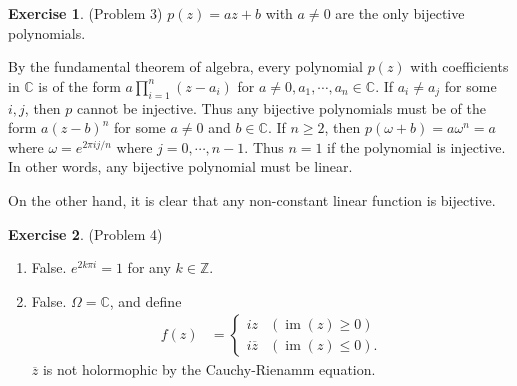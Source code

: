 \documentclass[12pt, psamsfonts]{amsart}
\theoremstyle{definition}
\newtheorem*{exer}{Exercise}
\theoremstyle{remark}
\DeclareMathOperator{\im}{im}
\numberwithin{equation}{section}
\begin{document}
\begin{exer}{(Problem 3)}
  $p(z) = az + b$ with $a \ne 0$ are the only bijective polynomials.

  By the fundamental theorem of algebra, every polynomial $p(z)$ with coefficients in $\mathbb{C}$ is of the form $a\prod_{i=1}^{n}(z - a_i)$ for $a \ne 0, a_1, \cdots, a_n \in \mathbb{C}$.
  If $a_i \ne a_j$ for some $i, j$, then $p$ cannot be injective.
  Thus any bijective polynomials must be of the form $a(z - b)^n$ for some $a \ne 0$ and $b \in \mathbb{C}$.
  If $n \geq 2$, then $p(\omega + b) = a\omega^n = a$ where $\omega = e^{2\pi i j / n}$ where $j = 0, \cdots, n - 1$.
  Thus $n = 1$ if the polynomial is injective.
  In other words, any bijective polynomial must be linear.

  On the other hand, it is clear that any non-constant linear function is bijective.
\end{exer}

\begin{exer}{(Problem 4)}
 $ $
  \begin{enumerate}[label=(\alph*)]
    \item 
      False. $e^{2k\pi i} = 1$ for any $k \in \mathbb{Z}$.
    \item
      False. $\Omega = \mathbb{C}$, and define
      \begin{align*}
        f(z) &= \begin{cases}
          iz & (\im(z) \geq 0) \\
          i\overline{z} & (\im(z) \leq 0).
        \end{cases}
      \end{align*}
      $\overline{z}$ is not holormophic by the Cauchy-Rienamm equation.
  \end{enumerate}
\end{exer}
\end{document}
